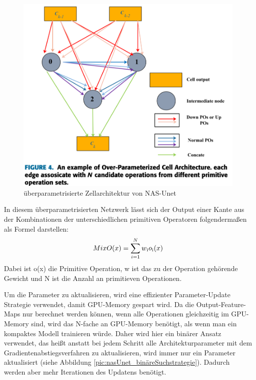 \begin{figure}[H]
	
	\centering
	\includegraphics[scale=0.5]{Pictures/nasUnet/Bild3.png}
	\caption{überparametrisierte Zellarchitektur von NAS-Unet \cite{nasunetPaper} }
	\label{pic:nasUnet_Zellarchitektur_überparametrisiert}
\end{figure}


In diesem überparametrisierten Netzwerk lässt sich der Output einer Kante aus der Kombinationen der unterschiedlichen primitiven Operatoren folgendermaßen als Formel darstellen: $$MixO(x)=\sum\limits_{i=1}^{N}w\textsubscript{i}o\textsubscript{i}(x)$$
Dabei ist o(x) die Primitive Operation, w ist das zu der Operation gehörende Gewicht und N ist die Anzahl an primitieven Operationen. 

Um die Parameter zu aktualisieren, wird eine effizienter Parameter-Update Strategie verwendet, damit GPU-Memory gespart wird. Da die Output-Feature-Maps nur berechnet werden können, wenn alle Operationen gleichzeitig im GPU-Memory sind, wird das N-fache an GPU-Memory benötigt, als wenn man ein kompaktes Modell trainieren würde. Daher wird hier ein binärer Ansatz verwendet, das heißt anstatt bei jedem Schritt alle Architekturparameter mit dem Gradientenabstiegsverfahren zu aktualisieren, wird immer nur ein Parameter aktualisiert (siehe Abbildung \ref{pic:nasUnet_binäreSuchstrategie}). Dadurch werden aber mehr Iterationen des Updatens benötigt.

